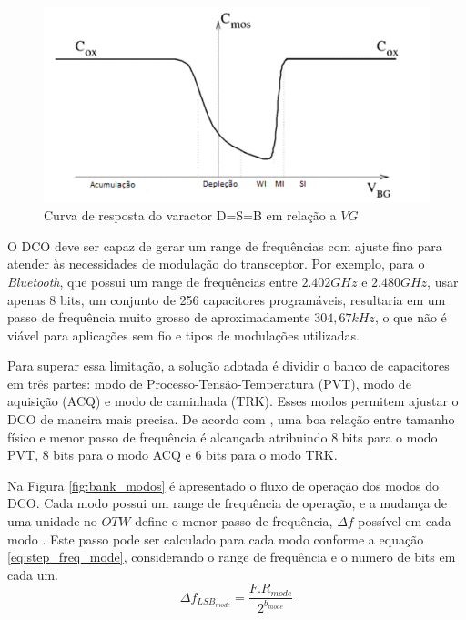 \begin{figure}[h!]
	\caption{Curva de resposta do varactor D=S=B em relação a $VG$ }
	\begin{center}
		\includegraphics[scale=0.6]{img/curva_COX_vbg.png}
	\end{center}
	\label{fig:curva_COX_vbg}
\end{figure}

O DCO deve ser capaz de gerar um range de frequências com ajuste fino para atender às necessidades de modulação do transceptor. Por exemplo, para o \textit{Bluetooth}, que possui um range de frequências entre $2.402GHz$ e $2.480GHz$, usar apenas 8 bits, um conjunto de 256 capacitores programáveis, resultaria em um passo de frequência muito grosso de aproximadamente $304,67kHz$, o que não é viável para aplicações sem fio e tipos de modulações utilizadas.

Para superar essa limitação, a solução adotada é dividir o banco de capacitores em três partes: modo de Processo-Tensão-Temperatura (PVT), modo de aquisição (ACQ) e modo de caminhada (TRK). Esses modos permitem ajustar o DCO de maneira mais precisa. De acordo com \cite{staszewski2006all}, uma boa relação entre tamanho físico e menor passo de frequência é alcançada atribuindo 8 bits para o modo PVT, 8 bits para o modo ACQ e 6 bits para o modo TRK.

Na Figura \ref{fig:bank_modos} é apresentado o fluxo de operação dos modos do DCO. Cada modo possui um range de frequência de operação, e a mudança de uma unidade no $OTW$ define o menor passo de frequência,  $\Delta f$ possível em cada modo . Este passo pode ser calculado para cada modo conforme a equação \ref{eq:step_freq_mode}, considerando o range de frequência e o numero de bits em cada um. 
\begin{equation}
	\Delta f_{LSB_{mode}} = \frac{F.R_{mode}}{2^{b_{mode}}}
	\label{eq:step_freq_mode}
\end{equation}

